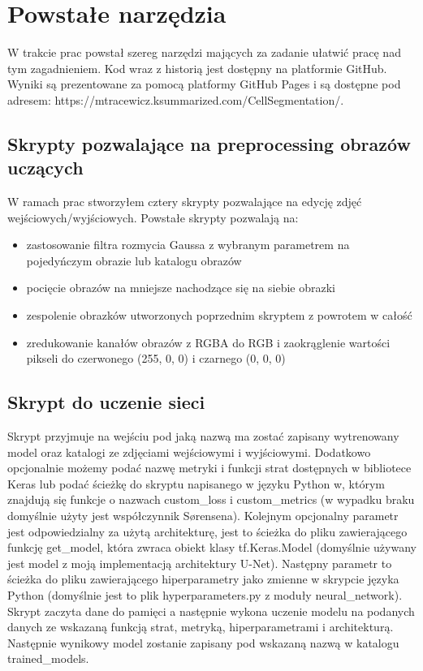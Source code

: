 \documentclass{article}
\begin{document}
\section{Powstałe narzędzia}
W trakcie prac powstał szereg narzędzi mających za zadanie ułatwić pracę nad tym zagadnieniem.
Kod wraz z historią jest dostępny na platformie GitHub.
Wyniki są prezentowane za pomocą platformy GitHub Pages i są dostępne pod adresem: https://mtracewicz.ksummarized.com/CellSegmentation/.
\subsection{Skrypty pozwalające na preprocessing obrazów uczących}
W ramach prac stworzyłem cztery skrypty pozwalające na edycję zdjęć wejściowych/wyjściowych.
Powstałe skrypty pozwalają na:
\begin{itemize}
  \item zastosowanie filtra rozmycia Gaussa z wybranym parametrem na pojedyńczym obrazie lub katalogu obrazów
  \item pocięcie obrazów na mniejsze nachodzące się na siebie obrazki
  \item zespolenie obrazków utworzonych poprzednim skryptem z powrotem w całość
  \item zredukowanie kanałów obrazów z RGBA do RGB i zaokrąglenie wartości pikseli do czerwonego (255, 0, 0) i czarnego (0, 0, 0)
\end{itemize}
\subsection{Skrypt do uczenie sieci}
Skrypt przyjmuje na wejściu pod jaką nazwą ma zostać zapisany wytrenowany model oraz katalogi ze zdjęciami wejściowymi i wyjściowymi.
Dodatkowo opcjonalnie możemy podać nazwę metryki i funkcji strat dostępnych w bibliotece Keras lub podać ścieżkę do skryptu napisanego w języku Python w, którym znajdują się funkcje o nazwach custom\_loss i custom\_metrics (w wypadku braku domyślnie użyty jest współczynnik Sørensena).
Kolejnym opcjonalny parametr jest odpowiedzialny za użytą architekturę, jest to ścieżka do pliku zawierającego funkcję get\_model, która zwraca obiekt klasy tf.Keras.Model (domyślnie używany jest model z moją implementacją architektury U-Net).
Następny parametr to ścieżka do pliku zawierającego hiperparametry jako zmienne w skrypcie języka Python (domyślnie jest to plik hyperparameters.py z moduły neural\_network).
Skrypt zaczyta dane do pamięci a następnie wykona uczenie modelu na podanych danych ze wskazaną funkcją strat, metryką, hiperparametrami i architekturą.
Następnie wynikowy model zostanie zapisany pod wskazaną nazwą w katalogu trained\_models.
\end{document}
